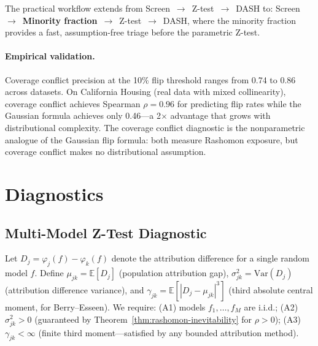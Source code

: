 \documentclass{article}
\newcommand{\E}{\mathbb{E}}
\newcommand{\Var}{\mathrm{Var}}
\begin{document}
The practical workflow extends from Screen~$\to$~Z-test~$\to$~DASH to: Screen~$\to$~\textbf{Minority fraction}~$\to$~Z-test~$\to$~DASH, where the minority fraction provides a fast, assumption-free triage before the parametric Z-test.

\paragraph{Empirical validation.}
Coverage conflict precision at the 10\% flip threshold ranges from 0.74 to 0.86 across datasets. On California Housing (real data with mixed collinearity), coverage conflict achieves Spearman $\rho = 0.96$ for predicting flip rates while the Gaussian formula achieves only 0.46---a 2$\times$ advantage that grows with distributional complexity. The coverage conflict diagnostic is the nonparametric analogue of the Gaussian flip formula: both measure Rashomon exposure, but coverage conflict makes no distributional assumption.


\section{Diagnostics}
\label{sec:diagnostics}

\subsection{Multi-Model Z-Test Diagnostic}
\label{sec:f1}

Let $D_j = \varphi_j(f) - \varphi_k(f)$ denote the attribution difference for a single random model $f$. Define $\mu_{jk} = \E[D_j]$ (population attribution gap), $\sigma_{jk}^2 = \Var(D_j)$ (attribution difference variance), and $\gamma_{jk} = \E[|D_j - \mu_{jk}|^3]$ (third absolute central moment, for Berry--Esseen). We require: (A1) models $f_1, \ldots, f_M$ are i.i.d.; (A2) $\sigma_{jk}^2 > 0$ (guaranteed by Theorem~\ref{thm:rashomon-inevitability} for $\rho > 0$); (A3) $\gamma_{jk} < \infty$ (finite third moment---satisfied by any bounded attribution method).
\end{document}
